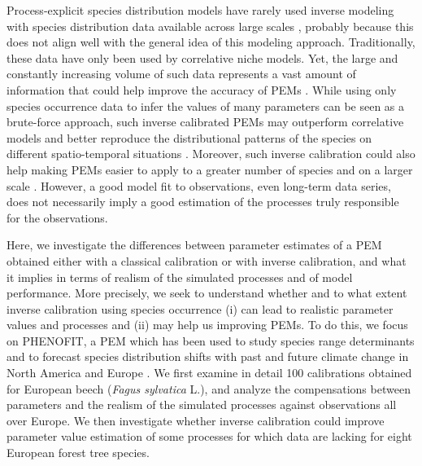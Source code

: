 \documentclass[preprint,12pt,authoryear]{elsarticle}
\begin{document}
Process-explicit species distribution models have rarely used inverse modeling with species distribution data available across large scales \citep{Higgins2012, VanderMeersch2023}, probably because this does not align well with the general idea of this modeling approach. Traditionally, these data have only been used by correlative niche models. Yet, the large and constantly increasing volume of such data \citep{Feng2022} represents a vast amount of information that could help improve the accuracy of PEMs \citep{Evans2016}. While using only species occurrence data to infer the values of many parameters can be seen as a brute-force approach, such inverse calibrated PEMs may outperform correlative models and better reproduce the distributional patterns of the species on different spatio-temporal situations \citep{Higgins2020, VanderMeersch2024}.  Moreover, such inverse calibration could also help making PEMs easier to apply to a greater number of species and on a larger scale \citep[e.g.][]{Conradi2024}. However, a good model fit to observations, even long-term data series, does not necessarily imply a good estimation of the processes truly responsible for the observations. 

Here, we investigate the differences between parameter estimates of a PEM obtained either with a classical calibration or with inverse calibration, and what it implies in terms of realism of the simulated processes and of model performance. More precisely, we seek to understand whether and to what extent inverse calibration using species occurrence (i) can lead to realistic parameter values and processes and (ii) may help us improving PEMs. To do this, we focus on PHENOFIT, a PEM which has been used to study species range determinants and to forecast species distribution shifts with past and future climate change in North America and Europe
\citep{Morin2007, Saltre2013, Saltre2015, Cheaib2012}. We first examine in detail 100 calibrations obtained for European beech (\emph{Fagus sylvatica} L.), and analyze the compensations between parameters and the realism of the simulated processes against observations all over Europe. We then investigate whether inverse calibration could improve parameter value estimation of some processes for which data are lacking for eight European forest tree species. 
\end{document}
